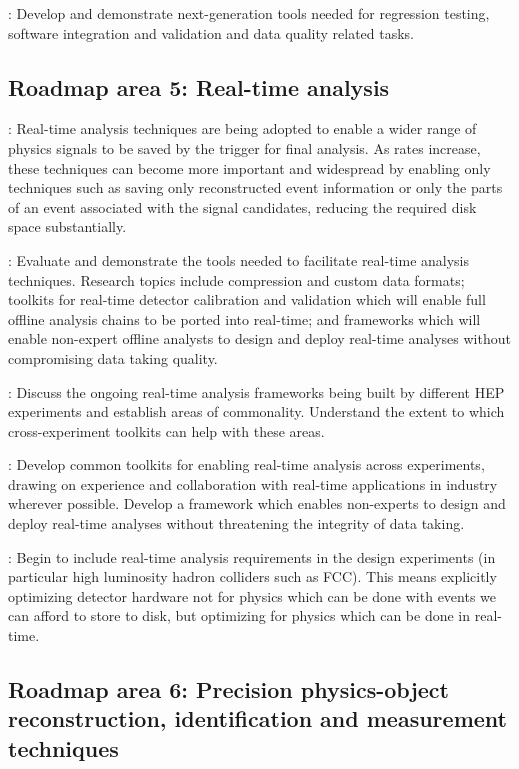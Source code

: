\vskip 0.5cm
: Develop and demonstrate next-generation tools needed for regression testing, software integration and validation and data quality related tasks. 

\subsection{Roadmap area 5: Real-time analysis}

: Real-time analysis techniques are being adopted to enable a wider range of physics signals to be saved by the trigger for final analysis. As rates increase, these 
techniques can become more important and widespread by enabling only techniques such as saving only reconstructed event information or only
the parts of an event associated with the signal candidates, reducing the required disk space substantially.

\vskip 0.5cm
 : Evaluate and demonstrate the tools needed to facilitate real-time analysis techniques. Research topics include compression and custom data formats; toolkits for real-time 
detector calibration and validation which will enable full offline analysis chains to be ported into real-time; and frameworks which will enable non-expert offline analysts to design and deploy 
real-time analyses without compromising data taking quality. 

\vskip 0.5cm
: Discuss the ongoing real-time analysis frameworks being built by different HEP experiments and establish areas of commonality. Understand the extent to which 
cross-experiment toolkits can help with these areas. 

\vskip 0.5cm
: Develop common toolkits for enabling real-time analysis across experiments, drawing on experience and collaboration with real-time applications in industry 
wherever possible. Develop a framework which enables non-experts to design and deploy real-time analyses without threatening the integrity of data taking.

\vskip 0.5cm
: Begin to include real-time analysis requirements in the design experiments (in particular high luminosity hadron colliders such as FCC). This means explicitly 
optimizing detector hardware not for physics which can be done with events we can afford to store to disk, but optimizing for physics which can be done in real-time.

\subsection{Roadmap area 6: Precision physics-object reconstruction, identification and measurement techniques}

